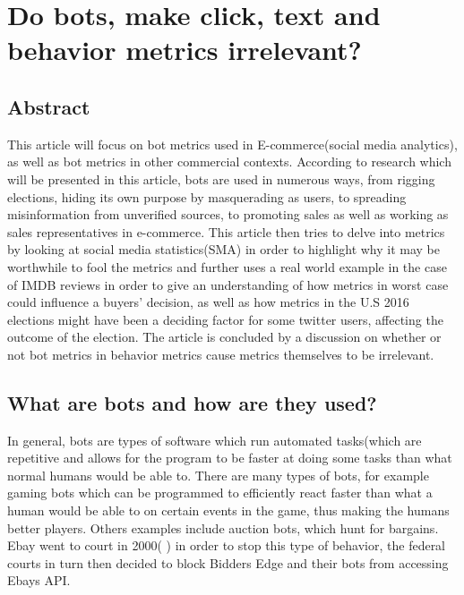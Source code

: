 \chapter[Bot Metrics]{Do bots,  make click, text and behavior metrics irrelevant?}
\section{Abstract}
This article will focus on bot metrics used in E-commerce(social media analytics), as well as bot metrics in other commercial contexts. According to research which will be presented in this article, bots are used in numerous ways, from rigging elections, hiding its own purpose by masquerading as users, to spreading misinformation from unverified sources, to promoting sales as well as working as sales representatives in e-commerce. This article then tries to delve into metrics by looking at social media statistics(SMA) in order to highlight why it may be worthwhile to fool the metrics and further uses a real world example in the case of IMDB reviews in order to give an understanding of how metrics in worst case could influence a buyers' decision, as well as how metrics in the U.S 2016 elections might have been a deciding factor for some twitter users, affecting the outcome of the election. The article is concluded by a discussion on whether or not bot metrics in behavior metrics cause metrics themselves to be irrelevant. 

\section{What are bots and how are they used?}\label{intro:howwhenwhy}
In general, bots are types of software which run automated tasks(which are repetitive and allows for the program to be faster at doing some tasks than what normal humans would be able to. There are many types of bots, for example gaming bots which can be programmed to efficiently react faster than what a human would be able to on certain events in the game, thus making the humans better players. Others examples include auction bots, which hunt for bargains. Ebay went to court in 2000( \cite{Computerworld:Ebay}) in order to stop this type of behavior, the federal courts in turn then decided to block Bidders Edge and their bots from accessing Ebays API.
\\

